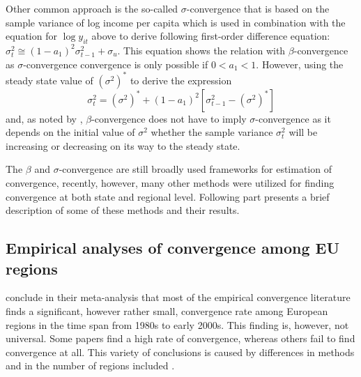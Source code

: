 \documentclass[11pt]{article}
\begin{document}
Other common approach is the so-called $\sigma$-convergence that is based on the sample variance of log income per capita which is used in combination with the equation for $\log y_{it}$ above to derive following first-order difference equation:
 \(
\sigma_{t}^{2} \cong (1-a_{1})^2\sigma_{t-1}^{2} + \sigma_{u}\).
This equation shows the relation with $\beta$-convergence as $\sigma$-convergence convergence is only possible if \(0 < a_{1} < 1\). However, using the steady state value of $(\sigma^{2})^{*}$ to derive the expression \begin{equation} \label{eq2}\sigma_{t}^{2} = (\sigma^{2})^{*} + (1-a_{1})^2[\sigma_{t-1}^{2} - (\sigma^{2})^{*}] \end{equation}
and, as noted by \citet{sala1996regional},  $\beta$-convergence does not have to imply $\sigma$-convergence as it depends on the initial value of $\sigma^{2}$ whether the sample variance  $\sigma_{t}^{2}$ will be increasing or decreasing on its way to the steady state.

The $\beta$ and $\sigma$-convergence are still broadly used frameworks for estimation of convergence, recently, however, many other methods were utilized for finding convergence at both state and regional level. Following part presents a brief description of some of these methods and their results.
  
 \subsection{Empirical analyses of convergence among EU regions}

\citet{eckey2007convergence} conclude in their meta-analysis that most of the empirical convergence literature finds a significant, however rather small, convergence rate among European regions in the time span from 1980s to early 2000s. This finding is, however, not universal. Some papers find a high rate of convergence, whereas others fail to find convergence at all. This variety of conclusions is caused by differences in methods and in the number of regions included \citep{eckey2007convergence}.
 
\end{document}
